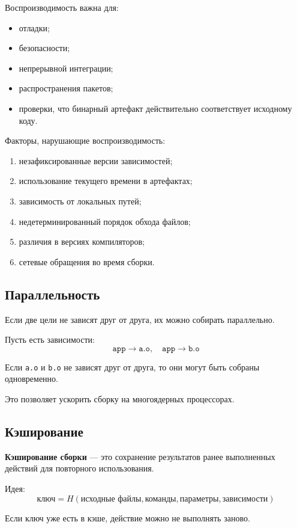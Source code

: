 \documentclass[12pt,a4paper]{article}
\begin{document}
Воспроизводимость важна для:
\begin{itemize}
    \item отладки;
    \item безопасности;
    \item непрерывной интеграции;
    \item распространения пакетов;
    \item проверки, что бинарный артефакт действительно соответствует исходному коду.
\end{itemize}

Факторы, нарушающие воспроизводимость:
\begin{enumerate}
    \item незафиксированные версии зависимостей;
    \item использование текущего времени в артефактах;
    \item зависимость от локальных путей;
    \item недетерминированный порядок обхода файлов;
    \item различия в версиях компиляторов;
    \item сетевые обращения во время сборки.
\end{enumerate}

\subsection{Параллельность}

Если две цели не зависят друг от друга, их можно собирать параллельно.

Пусть есть зависимости:
\[
\texttt{app} \rightarrow \texttt{a.o}, \quad
\texttt{app} \rightarrow \texttt{b.o}
\]

Если \texttt{a.o} и \texttt{b.o} не зависят друг от друга, то они могут быть собраны одновременно.

Это позволяет ускорить сборку на многоядерных процессорах.

\subsection{Кэширование}

\textbf{Кэширование сборки} --- это сохранение результатов ранее выполненных действий для повторного использования.

Идея:
\[
\text{ключ} = H(\text{исходные файлы}, \text{команды}, \text{параметры}, \text{зависимости})
\]

Если ключ уже есть в кэше, действие можно не выполнять заново.
\end{document}

